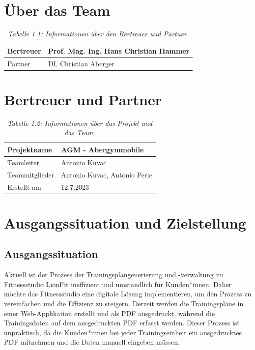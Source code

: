 \section{Über das Team}
\begin{table}[h]
    \centering
    \caption{\textit{Tabelle 1.1: Informationen über den Bertreuer und Partner.}}
    \begin{tabular}{|p{}|p{}|}
        \hline
        Bertreuer & Prof. Mag. Ing. Hans Christian Hammer \\ \hline
        Partner & DI. Christian Aberger \\ \hline
    \end{tabular}
\end{table}

\section{Bertreuer und Partner}
\begin{table}[h]
    \centering
    \caption{\textit{Tabelle 1.2: Informationen über das Projekt und das Team.}}
    \begin{tabular}{|p{}|p{}|}
        \hline
        Projektname & AGM - Abergymmobile \\ \hline
        Teamleiter & Antonio Kuvac \\ \hline
        Teammitglieder & Antonio Kuvac, Antonio Peric \\ \hline
        Erstellt am & 12.7.2023 \\ \hline
    \end{tabular}
\end{table}

\section{Ausgangssituation und Zielstellung}

\subsection{Ausgangssituation}
Aktuell ist der Prozess der Trainingsplangenerierung und -verwaltung im 
Fitnessstudio LionFit ineffizient und umständlich für Kunden*innen. 
Daher möchte das Fitnessstudio eine digitale Lösung implementieren,
um den Prozess zu vereinfachen und die Effizienz zu steigern. 
Derzeit werden die Trainingspläne in einer Web-Applikation 
erstellt und als PDF ausgedruckt, während die Trainingsdaten 
auf dem ausgedruckten PDF erfasst werden. Dieser Prozess ist 
unpraktisch, da die Kunden*innen bei jeder Trainingseinheit ein 
ausgedrucktes PDF mitnehmen und die Daten manuell eingeben müssen.

